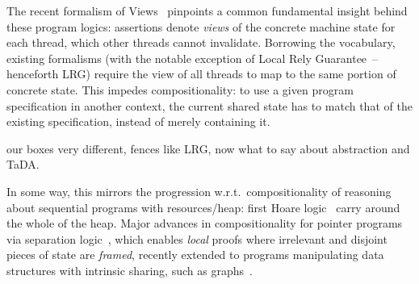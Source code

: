 The recent formalism of Views~\cite{views} pinpoints a common
fundamental insight behind these program logics: assertions denote
\emph{views} of the concrete machine state for each thread, which
other threads cannot invalidate. Borrowing the vocabulary, existing
formalisms (with the notable exception of Local Rely
Guarantee~\cite{lrg}--henceforth LRG) require the view of all threads
to map to the same portion of concrete state. This impedes
compositionality: to use a given program specification in another
context, the current shared state has to match that of the existing
specification, instead of merely containing it. 


our boxes very different,  fences like LRG, now what to say about
abstraction and TaDA. 

In some way, this mirrors the progression w.r.t.\ compositionality of
reasoning about sequential programs with resources/heap: first Hoare
logic~\cite{hoarelogic} carry around the whole of the heap. Major
advances in compositionality for pointer programs via separation
logic~\cite{seplog}, which enables \emph{local} proofs where
irrelevant and disjoint pieces of state are \emph{framed}, recently
extended to programs manipulating data structures with intrinsic
sharing, such as graphs~\cite{ramification}.
